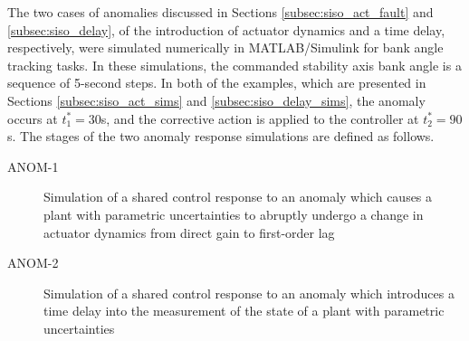 The two cases of anomalies discussed in Sections \ref{subsec:siso_act_fault} and \ref{subsec:siso_delay}, of the introduction of actuator dynamics and a time delay, respectively, were simulated numerically in MATLAB/Simulink for bank angle tracking tasks. In these simulations, the commanded stability axis bank angle is a sequence of 5-second steps. In both of the examples, which are presented in Sections \ref{subsec:siso_act_sims} and \ref{subsec:siso_delay_sims}, the anomaly occurs at $t_1^* = 30$s, and the corrective action is applied to the controller at $t_2^* = 90$s. The stages of the two anomaly response simulations are defined as follows.
\begin{description}
	\item[ANOM-1] Simulation of a shared control response to an anomaly which causes a plant with parametric uncertainties to abruptly undergo a change in actuator dynamics from direct gain to first-order lag
	\item[ANOM-2] Simulation of a shared control response to an anomaly which introduces a time delay into the measurement of the state of a plant with parametric uncertainties
\end{description}



